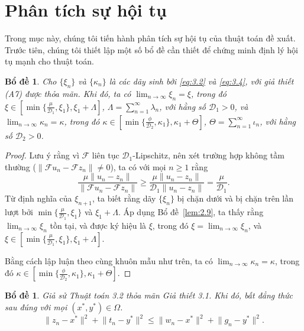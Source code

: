 \documentclass[11pt,a4paper]{article}
\theoremstyle{plain}
\newtheorem{lemma}[theorem]{Bổ đề}
\theoremstyle{definition}
\theoremstyle{remark}
\numberwithin{equation}{section}
\newcommand{\Fc}{\mathcal{F}}
\newcommand{\Dc}{\mathcal{D}}
\newcommand{\nm}[1]{\lVert #1\rVert}
\begin{document}
\section{Phân tích sự hội tụ}\label{sec:conv}

Trong mục này, chúng tôi tiến hành phân tích sự hội tụ của thuật toán đề xuất. Trước tiên, chúng tôi thiết lập một số bổ đề cần thiết để chứng minh định lý hội tụ mạnh cho thuật toán.

\begin{lemma}\label{lem:4.1}
Cho $\{\xi_n\}$ và $\{\kappa_n\}$ là các dãy sinh bởi \eqref{eq:3.2} và \eqref{eq:3.4}, với giả thiết (A7) được thỏa mãn. Khi đó, ta có $\displaystyle\lim_{n\to\infty}\xi_n=\xi$, trong đó $\xi\in[\min\{\tfrac{\mu}{\Dc_1},\xi_1\},\xi_1+\Lambda]$, $\Lambda=\sum_{n=1}^{\infty}\lambda_n$, với hằng số $\Dc_1>0$, và $\displaystyle\lim_{n\to\infty}\kappa_n=\kappa$, trong đó $\kappa\in[\min\{\tfrac{\phi}{\Dc_2},\kappa_1\},\kappa_1+\Theta]$, $\Theta=\sum_{n=1}^{\infty}\iota_n$, với hằng số $\Dc_2>0$.
\end{lemma}

\begin{proof}
Lưu ý rằng vì $\Fc$ liên tục $\Dc_1$-Lipschitz, nên xét trường hợp không tầm thường ($\nm{\Fc u_n-\Fc z_n}\ne 0$), ta có với mọi $n\ge 1$ rằng
\[
\frac{\mu\nm{u_n-z_n}}{\nm{\Fc u_n-\Fc z_n}}\ge\frac{\mu\nm{u_n-z_n}}{\Dc_1\nm{u_n-z_n}}=\frac{\mu}{\Dc_1}.
\]
Từ định nghĩa của $\xi_{n+1}$, ta biết rằng dãy $\{\xi_n\}$ bị chặn dưới và bị chặn trên lần lượt bởi $\min\{\tfrac{\mu}{\Dc_1},\xi_1\}$ và $\xi_1+\Lambda$. Áp dụng Bổ đề~\ref{lem:2.9}, ta thấy rằng $\lim_{n\to\infty}\xi_n$ tồn tại, và được ký hiệu là $\xi$, trong đó $\xi=\lim_{n\to\infty}\xi_n$, và $\xi\in[\min\{\tfrac{\mu}{\Dc_1},\xi_1\},\xi_1+\Lambda]$.

Bằng cách lập luận theo cùng khuôn mẫu như trên, ta có $\lim_{n\to\infty}\kappa_n=\kappa$, trong đó $\kappa\in[\min\{\tfrac{\phi}{\Dc_2},\kappa_1\},\kappa_1+\Theta]$.
\end{proof}

\begin{lemma}\label{lem:4.2}
Giả sử Thuật toán 3.2 thỏa mãn Giả thiết 3.1. Khi đó, bất đẳng thức sau đúng với mọi $(x^{*},y^{*})\in\Omega$.
\[
\nm{z_n-x^{*}}^2+\nm{t_n-y^{*}}^2\le\nm{w_n-x^{*}}^2+\nm{g_n-y^{*}}^2.
\]
\end{lemma}
\end{document}
